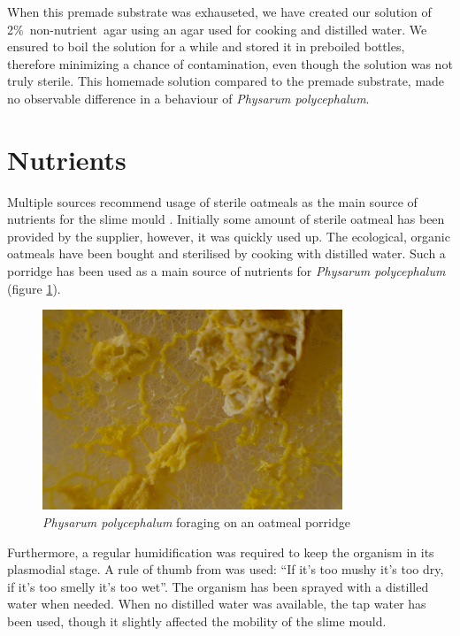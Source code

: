 When this premade substrate was exhauseted, we have created our solution of 2\%~non-nutrient~agar using an agar used for cooking and distilled water. We ensured to boil the solution for a while and stored it in preboiled bottles, therefore minimizing a chance of contamination, even though the solution was not truly sterile. This homemade solution compared to the premade substrate, made no observable difference in a behaviour of \textit{Physarum polycephalum}.


\section*{Nutrients}

Multiple sources recommend usage of sterile oatmeals as the main source of nutrients for the slime mould \cite{nakagaki2000intelligence,nakagaki2004obtaining,adamatzky2010physarum}. Initially some amount of sterile oatmeal has been provided by the supplier, however, it was quickly used up. The ecological, organic oatmeals have been bought and sterilised by cooking with distilled water. Such a porridge has been used as a main source of nutrients for \textit{Physarum polycephalum} (figure \ref{figure:p_porridge}).

\begin{figure}
  \centering

  \includegraphics[width=0.8\textwidth]{figures/physarum/D8E_2184.jpg}

  \caption{\textit{Physarum polycephalum} foraging on an oatmeal porridge}
  \label{figure:p_porridge}
\end{figure}

Furthermore, a regular humidification was required to keep the organism in its plasmodial stage. A rule of thumb from \cite{adamatzky2010physarum} was used: ``If it's too mushy it's too dry, if it's too smelly it's too wet''. The organism has been sprayed with a distilled water when needed. When no distilled water was available, the tap water has been used, though it slightly affected the mobility of the slime mould.
